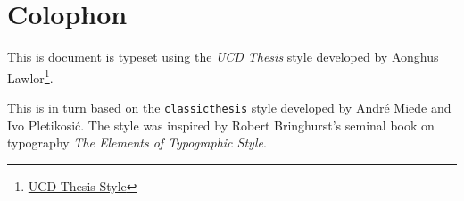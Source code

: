 \pagestyle{empty}

\hfill

\vfill


\section*{Colophon}
This is document is typeset using the \emph{UCD Thesis} style developed by Aonghus Lawlor\footnote{\href{http://github.com/aonghus/}{UCD Thesis Style}}.

This is in turn based on the \texttt{classicthesis} style developed by Andr\'e Miede and Ivo Pletikosić.
The style was inspired by Robert Bringhurst's seminal book on typography \emph{The Elements of Typographic Style}.

\bigskip

\noindent\finalVersionString
